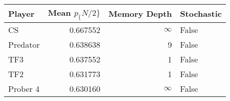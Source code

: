 \begin{tabular}{lrrl}
\toprule
   Player &  Mean $p_\{N/2\}$ &  Memory Depth & Stochastic \\
\midrule
       CS &        0.667552 &            \(\infty\) &      False \\
 Predator &        0.638638 &             9 &      False \\
      TF3 &        0.637552 &             1 &      False \\
      TF2 &        0.631773 &             1 &      False \\
 Prober 4 &        0.630160 &            \(\infty\) &      False \\
\bottomrule
\end{tabular}
